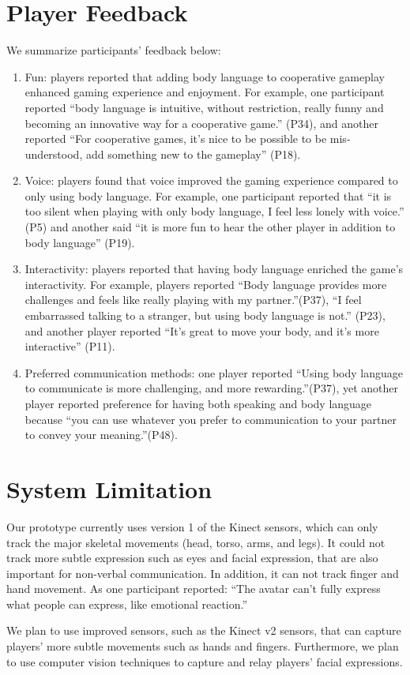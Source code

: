 \section{Player Feedback}
We summarize participants' feedback below:
\begin{enumerate}
  \item Fun: players reported that adding body language to cooperative gameplay enhanced gaming experience and enjoyment. For example, one participant reported ``body language is intuitive, without restriction, really funny and becoming an innovative way for a cooperative game.'' (P34), and another reported
	``For cooperative games, it's nice to be possible to be mis-understood, add something new to the gameplay'' (P18).

  \item Voice: players found that voice improved the gaming experience compared to only using body language. For example, one participant reported that ``it is too silent when playing with only body language, I feel less lonely with voice.'' (P5) and another said ``it is more fun to hear the other player in addition to body language'' (P19).


  \item Interactivity: players reported that having body language enriched the game's interactivity. For example, players reported ``Body language provides more challenges and feels like really playing with my partner.''(P37), ``I feel embarrassed talking to a stranger, but using body language is not.'' (P23), and another player reported ``It's great to move your body, and it's more interactive'' (P11). 


  \item Preferred communication methods: one player reported ``Using body language to communicate is more challenging, and more rewarding.''(P37), yet another player reported preference for having both speaking and body language because ``you can use whatever you prefer to communication to your partner to convey your meaning.''(P48). 

\end{enumerate}



\section{System Limitation}
Our prototype currently uses version 1 of the Kinect sensors, which can only track the major skeletal movements (head, torso, arms, and legs). It could not track more subtle expression such as eyes and facial expression, that are also important for non-verbal communication. In addition, it can not track finger and hand movement. As one participant reported: ``The avatar can't fully express what people can express, like emotional reaction.''

We plan to use improved sensors, such as the Kinect v2 sensors, that can capture players' more subtle movements such as hands and fingers. Furthermore, we plan to use computer vision techniques to capture and relay players' facial expressions.
